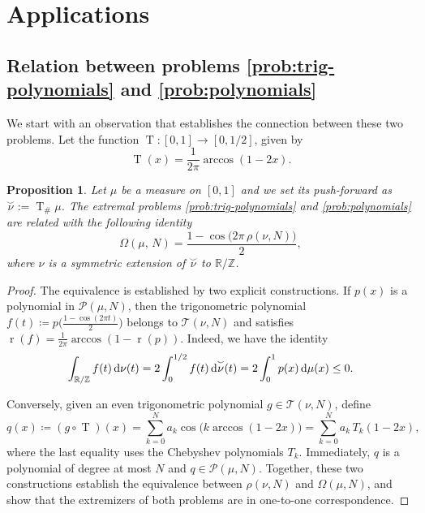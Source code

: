 \documentclass[reqno, a4paper]{amsart}
\def\T{\mathbb{R}/\mathbb{Z}}
\renewcommand{\d}{\text{\rm d}}
\newcommand{\nuarc}{\overset{\smallsmile}{\nu}}
\renewcommand{\r}{\operatorname{r}}
\theoremstyle{plain}
\newtheorem{proposition}[theorem]{Proposition}
\theoremstyle{definition}
\theoremstyle{remarkstyle}
\numberwithin{equation}{section}
\begin{document}
\section{Applications}
\subsection{Relation between problems \ref{prob:trig-polynomials} and \ref{prob:polynomials}}

We start with an observation that establishes the connection between these two problems.
Let the function $\operatorname{T} :[0,1] \to [0,1/2]$, given by 
$$\operatorname{T}(x)=\frac{1}{2\pi}\arccos(1-2x).$$

\begin{proposition}\label{prop:equivalence-with-polynomial-problem}
Let $\mu$ be a measure on $[0,1]$ and we set its push-forward as $\nuarc:=\operatorname{T}_{\#} \mu$. The extremal problems \textnormal{\ref{prob:trig-polynomials}} and \textnormal{\ref{prob:polynomials}} are related with the following identity
\begin{equation*}
  \Omega(\mu,\, N) =\frac{1- \cos\bigl(2\pi\,\rho(\nu, N)\bigr)}{2},
\end{equation*}
where $\nu$ is a symmetric extension of $\nuarc$ to $\T$.
\end{proposition}


\begin{proof}
The equivalence is established by two explicit constructions. If $p(x)$ is a polynomial in $\mathcal{P}(\mu,N)$, then the trigonometric
polynomial $f(t) \coloneqq p\bigl(\frac{1-\cos(2\pi t)}{2}\bigr)$ belongs to $\mathcal{T}(\nu, N)$ and satisfies
$\r(f) = \frac{1}{2\pi}\arccos(1-\r(p))$. Indeed, we have the identity
\begin{equation*}
    \int_{\T} f(t)\,\d\nu(t)=2\int_{0}^{1/2} f(t)\, \d\nuarc(t)=2\int_{0}^{1} p(x)\, \d\mu(x)\leq 0.
\end{equation*}

Conversely, given an even trigonometric polynomial $g \in \mathcal{T}(\nu, N)$, define
\begin{equation*}
    q(x) \coloneqq (g\circ \operatorname{T}) (x)=\sum_{k=0}^{N} a_k \cos \bigl(k\arccos(1-2x)\bigr)=\sum_{k=0}^{N} a_k\, T_{k}(1-2x),
\end{equation*}
where the last equality uses the Chebyshev polynomials $T_{k}$.
Immediately, $q$ is a polynomial of degree at most $N$ and 
$q \in \mathcal{P}(\mu, N)$. Together, these two constructions establish the equivalence between $\rho(\nu, N)$ and $\Omega(\mu, N)$,
and show that the extremizers of both problems are in one-to-one correspondence.
\end{proof}
\end{document}
